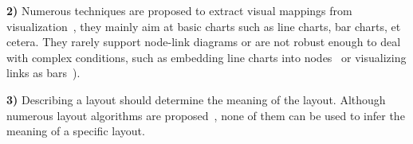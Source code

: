{\noindent \textbf{2)} %
Numerous techniques are proposed to extract visual mappings from visualization~\cite{DBLP:conf/uist/HarperA14, DBLP:journals/tvcg/HoqueA20, DBLP:journals/corr/abs-2103-00741},  they mainly aim at basic charts such as line charts, bar charts, et cetera.
They rarely support node-link diagrams or are not robust enough to deal with complex conditions, such as embedding line charts into nodes~\cite{DBLP:journals/bmcbi/JunkerKS06} or visualizing links as bars~\cite{DBLP:conf/iv/SchoffelSE16}).

\noindent \textbf{3)} Describing a layout should determine the meaning of the layout.
Although numerous layout algorithms are proposed~\cite{hachul2004drawing, DBLP:journals/spe/FruchtermanR91, DBLP:conf/gd/GansnerKN04, DBLP:conf/gd/BrandesP06, DBLP:journals/tvcg/ZhuCHHLZ21}, none of them can be used to infer the meaning of a specific layout.
}